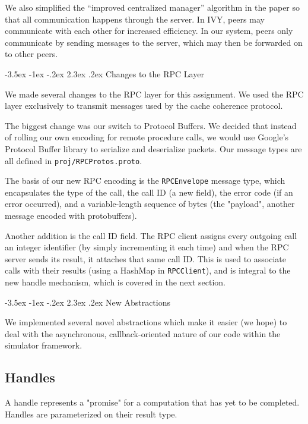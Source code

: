 \documentclass[12pt]{article}	%
\makeatletter
\renewcommand\section{\@startsection{section}{1}{\z@}%
                                 {-3.5ex \@plus -1ex \@minus -.2ex}%
                                 {2.3ex \@plus.2ex}%
                                 {\normalfont\large\bfseries}}
\makeatother
\begin{document}
We also simplified the ``improved centralized manager'' algorithm in the paper so that all communication happens through the server. In IVY, peers may communicate with each other for increased efficiency. In our system, peers only communicate by sending messages to the server, which may then be forwarded on to other peers.

\section{Changes to the RPC Layer}

We made several changes to the RPC layer for this assignment. We used the RPC layer exclusively to transmit messages used by the cache coherence protocol.

The biggest change was our switch to Protocol Buffers. We decided that instead of rolling our own encoding for remote procedure calls, we would use Google's Protocol Buffer library to serialize and deserialize packets. Our message types are all defined in \texttt{proj/RPCProtos.proto}.

The basis of our new RPC encoding is the \texttt{RPCEnvelope} message type, which encapsulates the type of the call, the call ID (a new field), the error code (if an error occurred), and a variable-length sequence of bytes (the "payload", another message encoded with protobuffers).

Another addition is the call ID field. The RPC client assigns every outgoing call an integer identifier (by simply incrementing it each time) and when the RPC server sends its result, it attaches that same call ID. This is used to associate calls with their results (using a HashMap in \texttt{RPCClient}), and is integral to the new handle mechanism, which is covered in the next section.

\section{New Abstractions}

We implemented several novel abstractions which make it easier (we hope) to deal with the asynchronous, callback-oriented nature of our code within the simulator framework.

\subsection{Handles}

A handle represents a "promise" for a computation that has yet to be completed. Handles are parameterized on their result type.
\end{document}
